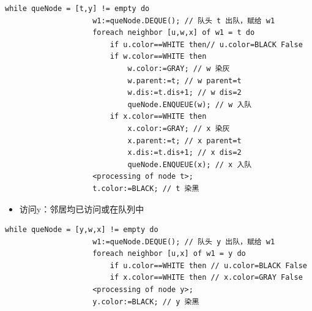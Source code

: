 \documentclass{article}
\begin{document}
\begin{enumerate}
    \begin{lstlisting}[style=algorithmPPT]
                while queNode = [t,y] != empty do 
                    w1:=queNode.DEQUE(); // 队头 t 出队，赋给 w1
                    foreach neighbor [u,w,x] of w1 = t do
                        if u.color==WHITE then// u.color=BLACK False
                        if w.color==WHITE then
                            w.color:=GRAY; // w 染灰
                            w.parent:=t; // w parent=t
                            w.dis:=t.dis+1; // w dis=2
                            queNode.ENQUEUE(w); // w 入队
                        if x.color==WHITE then
                            x.color:=GRAY; // x 染灰
                            x.parent:=t; // x parent=t
                            x.dis:=t.dis+1; // x dis=2
                            queNode.ENQUEUE(x); // x 入队
                    <processing of node t>;
                    t.color:=BLACK; // t 染黑
                \end{lstlisting}    
        
    \begin{itemize}
        \item 访问y：邻居均已访问或在队列中
    \end{itemize}


    \begin{lstlisting}[style=algorithmPPT]
                while queNode = [y,w,x] != empty do
                    w1:=queNode.DEQUE(); // 队头 y 出队，赋给 w1
                    foreach neighbor [u,x] of w1 = y do 
                        if u.color==WHITE then // u.color=BLACK False
                        if x.color==WHITE then // x.color=GRAY False
                    <processing of node y>;
                    y.color:=BLACK; // y 染黑        
                \end{lstlisting}  
    
    \begin{figure}[htbp]
        \begin{minipage}[b]{0.6\textwidth}    %
            \centering
                \begin{tikzpicture}[
                    scale=1.5,
                    node distance=2.5cm,
                    every node/.style={
                        circle, 
                        draw, 
                        minimum size=2em,
                        inner sep=4pt,
                        font=\large
                    }
                ]
                    

\end{tikzpicture}
\end{minipage}
\end{figure}
\end{enumerate}
\end{document}

